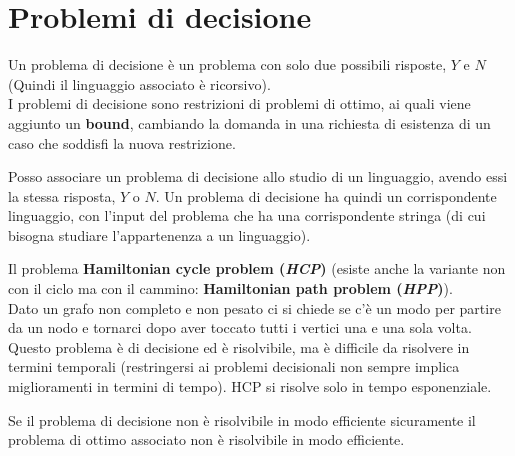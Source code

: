 \section{Problemi di decisione}
\begin{definizione}
  Un problema di decisione è un problema con solo due possibili risposte, $Y$ e
  $N$ (Quindi il linguaggio associato è ricorsivo).\\
  I problemi di decisione sono restrizioni di problemi di ottimo, ai quali viene
  aggiunto un \textbf{bound}, cambiando la domanda in una richiesta di esistenza
  di un caso che soddisfi la nuova restrizione.
\end{definizione}
\begin{definizione}
  Posso associare un problema di decisione allo studio di un linguaggio, avendo
essi la stessa risposta, $Y$ o $N$. Un problema di decisione ha quindi un
corrispondente linguaggio, con l'input del problema che ha una corrispondente
stringa (di cui bisogna studiare l'appartenenza a un linguaggio).
\end{definizione}
\begin{esempio}
  Il problema \textbf{Hamiltonian cycle problem (\textit{HCP})} (esiste anche la
  variante non con il ciclo ma con il cammino: \textbf{Hamiltonian path problem
    (\textit{HPP})}).\\ 
  Dato un grafo non completo e non pesato ci si chiede se c'è un modo per
  partire da un nodo e tornarci dopo aver toccato tutti i vertici una e una sola
  volta.\\
  Questo problema è di decisione ed è risolvibile, ma è difficile da risolvere
  in termini temporali (restringersi ai problemi decisionali non sempre implica
  miglioramenti in termini di tempo). HCP si risolve solo in tempo esponenziale.
\end{esempio}
\begin{definizione}
  Se il problema di decisione non è risolvibile in modo efficiente sicuramente
  il problema di ottimo associato non è risolvibile in modo efficiente.
\end{definizione}
